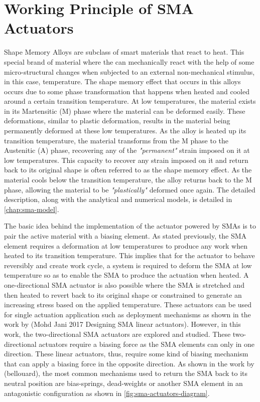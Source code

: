 \section{Working Principle of SMA Actuators}
Shape Memory Alloys are subclass of smart materials that react to heat. This special brand of material where the can mechanically react with the help of some micro-structural changes when subjected to an external non-mechanical stimulus, in this case, temperature. The shape memory effect that occurs in this alloys occurs due to some phase transformation that happens when heated and cooled around a certain transition temperature. At low temperatures, the material exists in its Martensitic (M) phase where the material can be deformed easily. These deformations, similar to plastic deformation, results in the material being permanently deformed at these low temperatures. As the alloy is heated up its transition temperature, the material transforms from the M phase to the Austenitic (A) phase, recovering any of the \textit{"permanent"} strain imposed on it at low temperatures. This capacity to recover any strain imposed on it and return back to its original shape is often referred to as the shape memory effect. As the material cools below the transition temperature, the alloy returns back to the M phase, allowing the material to be \textit{"plastically"} deformed once again. The detailed description, along with the analytical and numerical models, is detailed in \cref{chap:sma-model}.

The basic idea behind the implementation of the actuator powered by SMAs is to pair the active material with a biasing element. As stated previously, the SMA element requires a deformation at low temperatures to produce any work when heated to its transition temperature. This implies that for the actuator to behave reversibly and create work cycle, a system is required to deform the SMA at low temperature so as to enable the SMA to produce the actuation when heated. A one-directional SMA actuator is also possible where the SMA is stretched and then heated to revert back to its original shape or constrained to generate an increasing stress based on the applied temperature. These actuators can be used for single actuation application such as deployment mechanisms as shown in the work by \todocite (Mohd Jani 2017 Designing SMA linear actuators). However, in this work, the two-directional SMA actuators are explored and studied. These two-directional actuators require a biasing force as the SMA elements can only in one direction. These linear actuators, thus, require some kind of biasing mechanism that can apply a biasing force in the opposite direction. As shown in the work by \todocite (bellouard), the most common mechanisms used to return the SMA back to its neutral position are bias-springs, dead-weights or another SMA element in an antagonistic configuration as shown in \cref{fig:sma-actuators-diagram}.

